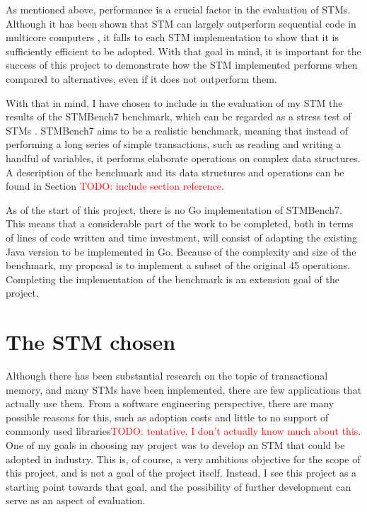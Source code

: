 \documentclass[12pt,a4paper,oneside,openright]{report}
\newcommand{\todo}[1]{\textcolor{red}{TODO: #1}}
\begin{document}
As mentioned above, performance is a crucial factor in the evaluation
of STMs. Although it has been shown that STM can largely outperform
sequential code in multicore computers \cite{MoreThanToy}, it falls to
each STM implementation to show that it is sufficiently efficient to
be adopted. With that goal in mind, it is important for the success of
this project to demonstrate how the STM implemented performs when
compared to alternatives, even if it does not outperform them.

With that in mind, I have chosen to include in the evaluation of my
STM the results of the STMBench7 benchmark, which can be regarded as a
stress test of STMs \cite{STMBench7}. STMBench7 aims to be a realistic
benchmark, meaning that instead of performing a long series of simple
transactions, such as reading and writing a handful of variables, it
performs elaborate operations on complex data structures. A
description of the benchmark and its data structures and operations
can be found in Section \todo{include section reference}.

As of the start of this project, there is no Go implementation of
STMBench7. This means that a considerable part of the work to be
completed, both in terms of lines of code written and time investment,
will consist of adapting the existing Java version to be implemented
in Go. Because of the complexity and size of the benchmark, my
proposal is to implement a subset of the original 45
operations. Completing the implementation of the benchmark is an
extension goal of the project.

\section{The STM chosen}
\label{sec:stm-chosen}

Although there has been substantial research on the topic of
transactional memory, and many STMs have been implemented, there are
few applications that actually use them. From a software engineering
perspective, there are many possible reasons for this, such as
adoption costs and little to no support of commonly used
libraries\todo{tentative, I don't actually know much about this}. One
of my goals in choosing my project was to develop an STM that could be
adopted in industry. This is, of course, a very ambitious objective
for the scope of this project, and is not a goal of the project
itself. Instead, I see this project as a starting point towards that
goal, and the possibility of further development can serve as an
aspect of evaluation.
\end{document}
